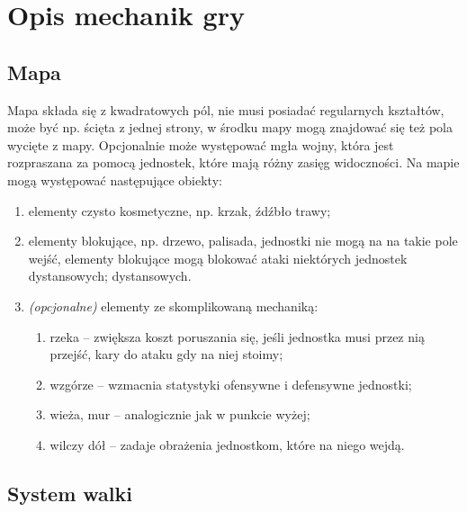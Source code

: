 \documentclass[oneside]{lmdEN}%
\begin{document}
\section{Opis mechanik gry}

\subsection{Mapa}

Mapa składa się z kwadratowych pól, nie musi posiadać regularnych kształtów, może być np. ścięta z jednej strony, w środku mapy mogą znajdować się też pola wycięte z mapy. Opcjonalnie może występować mgła wojny, która jest rozpraszana za pomocą jednostek, które mają różny zasięg widoczności. Na mapie mogą występować następujące obiekty:

\begin{enumerate}
    \item elementy czysto kosmetyczne, np. krzak, źdźbło trawy;
    \item elementy blokujące, np. drzewo, palisada, jednostki nie mogą na na takie pole wejść, elementy blokujące mogą blokować ataki niektórych jednostek dystansowych;
dystansowych.
    \item \textit{(opcjonalne)} elementy ze skomplikowaną mechaniką:
          \begin{enumerate}
              \item rzeka – zwiększa koszt poruszania się, jeśli jednostka musi przez nią przejść, kary do ataku gdy na niej stoimy;
              \item wzgórze – wzmacnia statystyki ofensywne i defensywne jednostki;
              \item wieża, mur – analogicznie jak w punkcie wyżej;
              \item wilczy dół – zadaje obrażenia jednostkom, które na niego wejdą.
          \end{enumerate}
\end{enumerate}

\subsection{System walki}
\end{document}
